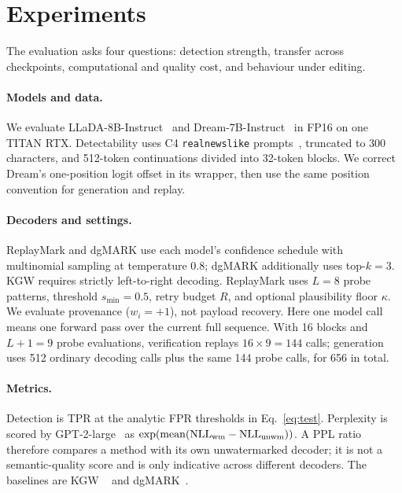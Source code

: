 
\section{Experiments}
\label{sec:experiments}

The evaluation asks four questions: detection strength, transfer across checkpoints,
computational and quality cost, and behaviour under editing.

\paragraph{Models and data.}
We evaluate LLaDA-8B-Instruct~\citep{nie2025llada} and
Dream-7B-Instruct~\citep{ye2025dream} in FP16 on one TITAN RTX. Detectability uses C4
\texttt{realnewslike} prompts~\citep{raffel2020c4}, truncated to 300 characters, and 512-token
continuations divided into 32-token blocks. We correct Dream's one-position logit offset in its
wrapper, then use the same position convention for generation and replay.

\paragraph{Decoders and settings.}
ReplayMark and dgMARK use each model's confidence schedule with multinomial sampling at
temperature $0.8$; dgMARK additionally uses top-$k=3$. KGW requires strictly left-to-right
decoding. ReplayMark uses $L=8$ probe patterns, threshold $s_{\min}=0.5$, retry budget $R$, and
optional plausibility floor $\kappa$. We evaluate provenance ($w_i=+1$), not payload recovery.
Here one model call means one forward pass over the current full sequence. With 16 blocks and
$L+1=9$ probe evaluations, verification replays $16\times9=144$ calls; generation uses 512 ordinary
decoding calls plus the same 144 probe calls, for 656 in total.

\paragraph{Metrics.}
Detection is TPR at the analytic FPR thresholds in Eq.~\eqref{eq:test}. Perplexity is scored by
GPT-2-large~\citep{radford2019gpt2} as
$\exp(\operatorname{mean}(\mathrm{NLL}_{\rm wm}-\mathrm{NLL}_{\rm unwm}))$. A PPL ratio therefore
compares a method with its own unwatermarked decoder; it is not a semantic-quality score and is
only indicative across different decoders. The baselines are KGW
~\citep{kirchenbauer2023watermark} and dgMARK~\citep{hong2026dgmark}.

